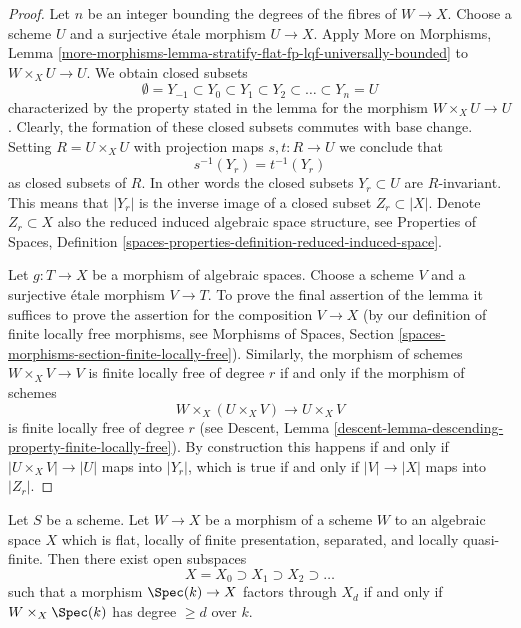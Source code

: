 \begin{proof}
Let $n$ be an integer bounding the degrees of the fibres of $W \to X$.
Choose a scheme $U$ and a surjective \'etale morphism $U \to X$.
Apply More on Morphisms, Lemma
\ref{more-morphisms-lemma-stratify-flat-fp-lqf-universally-bounded}
to $W \times_X U \to U$. We obtain closed subsets
$$
\emptyset = Y_{-1} \subset Y_0 \subset Y_1 \subset Y_2 \subset
\ldots \subset Y_n = U
$$
characterized by the property stated in the lemma for the morphism
$W \times_X U \to U$. Clearly, the formation of these closed subsets commutes
with base change. Setting $R = U \times_X U$ with projection maps
$s, t : R \to U$ we conclude that
$$
s^{-1}(Y_r) = t^{-1}(Y_r)
$$
as closed subsets of $R$. In other words the closed subsets $Y_r \subset U$
are $R$-invariant. This means that $|Y_r|$ is the inverse image of a closed
subset $Z_r \subset |X|$. Denote $Z_r \subset X$ also the reduced induced
algebraic space structure, see
Properties of Spaces, Definition
\ref{spaces-properties-definition-reduced-induced-space}.

\medskip\noindent
Let $g : T \to X$ be a morphism of algebraic spaces. Choose a scheme $V$
and a surjective \'etale morphism $V \to T$. To prove the final
assertion of the lemma it suffices to prove the assertion for the composition
$V \to X$ (by our definition of finite locally free morphisms, see
Morphisms of Spaces, Section
\ref{spaces-morphisms-section-finite-locally-free}).
Similarly, the morphism of schemes $W \times_X V \to V$ is finite
locally free of degree $r$ if and only if the morphism of schemes
$$
W \times_X (U \times_X V)
\longrightarrow
U \times_X V
$$
is finite locally free of degree $r$ (see
Descent, Lemma \ref{descent-lemma-descending-property-finite-locally-free}).
By construction this happens if and only if $|U \times_X V| \to |U|$
maps into $|Y_r|$, which is true if and only if $|V| \to |X|$ maps
into $|Z_r|$.
\end{proof}

\begin{lemma}
\label{lemma-stratify-flat-fp-lqf}
Let $S$ be a scheme. Let $W \to X$ be a morphism of a scheme $W$ to an
algebraic space $X$ which is flat, locally of finite presentation,
separated, and locally quasi-finite. Then there
exist open subspaces
$$
X = X_0 \supset X_1 \supset X_2 \supset \ldots
$$
such that a morphism $\Spec(k) \to X$ factors through $X_d$ if and
only if $W \times_X \Spec(k)$ has degree $\geq d$ over $k$.
\end{lemma}

